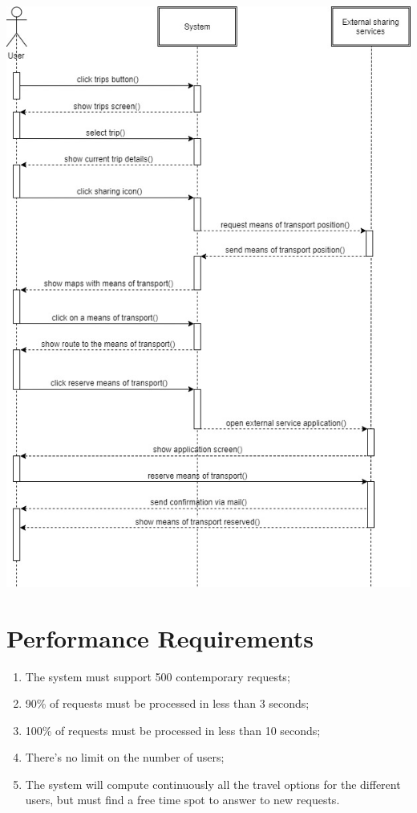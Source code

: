 \begin{center}
\includegraphics[scale=0.55]{MainMatter/images/sequencediagrams/reservesharing}
\end{center}
\pagebreak
%
%
\section{Performance Requirements}
\begin{enumerate}
\item The system must support 500 contemporary requests;
\item 90\% of requests must be processed in less than 3 seconds;
\item 100\% of requests must be processed in less than 10 seconds;
\item There’s no limit on the number of users;
\item The system will compute continuously all the travel options for the different users, but must find a free time spot to answer to new requests.
\end{enumerate}
%
%
